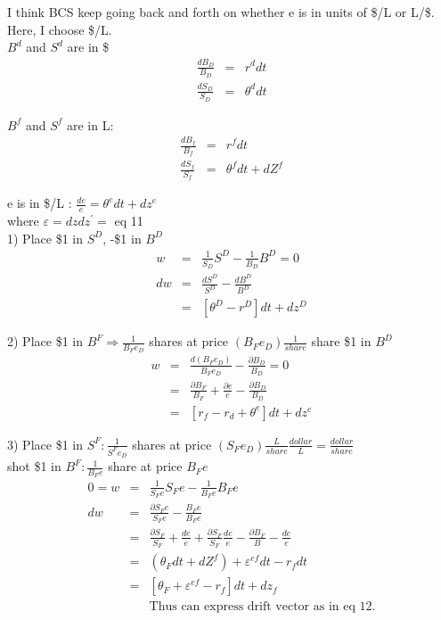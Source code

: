 \documentclass[]{article}
\begin{document}
I think BCS keep going back and forth on whether e is in units of \$/L or L/\$. Here, I choose \$/L.\\
$B^d$ and $S^d$ are in \$
\begin{eqnarray*}
\frac{dB_D}{B_D} &=& r^d dt\\
\frac{dS_D}{S_D} &=& \theta^d dt
\end{eqnarray*}

$B^f$ and $S^f$ are in L:
\begin{eqnarray*}
\frac{dB_f}{B_f} &=& r^f dt\\
\frac{dS_f}{S_f} &=& \theta^f dt + dZ^f
\end{eqnarray*}

e is in \$/L : $\frac{de}{e} = \theta^e dt + dz^e$\\
where $\varepsilon = dz dz^\prime = $ eq 11\\

1) Place \$1 in $S^D$, -\$1 in $B^D$
\begin{eqnarray*}
w &=& \frac{1}{S_D} S^D - \frac{1}{B_D} B^D = 0\\
dw &=& \frac{dS^D}{S^D} - \frac{dB^D}{B^D}\\
&=& [\theta^D - r^D]dt + dz^D
\end{eqnarray*}

2) Place \$1 in $B^F \Rightarrow \frac{1}{B_F e_D}$  shares at price $(B_F e_D)\frac{1}{share}$ share \$1 in $B^D$
\begin{eqnarray*}
w &=& \frac{d(B_Fe_D)}{B_Fe_D} - \frac{\partial B_D}{B_D} = 0\\
&=& \frac{\partial B_F}{B_F} + \frac{\partial e}{e} -\frac{\partial B_D}{B_D}\\
&=& [r_f - r_d + \theta^e]dt + dz^e
\end{eqnarray*}

3) Place \$1 in $S^F : \frac{1}{S^F e_D}$ shares at price $(S_F e_D) \frac{L}{share} \frac{dollar}{L} = \frac{dollar}{share}$\\
shot \$1 in $B^F : \frac{1}{B_F e}$ share at price $B_Fe$
\begin{eqnarray*}
0=w &=& \frac{1}{S_Fe} S_Fe - \frac{1}{B_Fe} B_Fe\\
dw &=& \frac{\partial S_Fe}{S_Fe} - \frac{B_Fe}{B_Fe}\\
&=& \frac{\partial S_F}{S_F} + \frac{de}{e} + \frac{\partial S_F}{S_F} \frac{de}{e} - \frac{\partial B_F}{B} - \frac{de}{e}\\
&=& (\theta_F dt + dZ^f) + \varepsilon ^{ef} dt - r_f dt\\
&=& [\theta_F + \varepsilon ^{ef} - r_f]dt + dz_f\\
&& \mbox{Thus can express drift vector as in eq 12.}
\end{eqnarray*}
\end{document}
